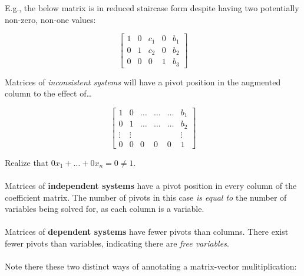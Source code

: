 \documentclass[12pt]{article}
\newcommand{\bt}[1]{\textbf{{#1}}}
\newcommand{\mb}{\begin{bmatrix}}
\newcommand{\me}{\end{bmatrix}}
\begin{document}
E.g., the below matrix is in reduced staircase form despite having two potentially non-zero, non-one values:

$$\mb
1 & 0 & c_1 & 0 & b_1 \\
0 & 1 & c_2 & 0 & b_2 \\
0 & 0 & 0 & 1 & b_3
\me$$

Matrices of \emph{inconsistent systems} will have a pivot position in the augmented column to the effect of\dots

$$\begin{bmatrix}
    1 & 0 & \dots & \dots & \dots & b_1 \\
    0 & 1 & \dots & \dots & \dots & b_2 \\
    \vdots & \vdots & & & & \vdots\\
    0 & 0 & 0 & 0 & 0 & 1
\end{bmatrix}$$

Realize that $0x_1 + \dots + 0x_n = 0 \neq 1$. \\ \\

Matrices of \bt{independent systems} have a pivot position in every column of the coefficient matrix.
The number of pivots in this case \emph{is equal to} the number of variables being solved for, as each column is a variable. \\ \\

Matrices of \bt{dependent systems} have fewer pivots than columns. There exist fewer pivots than variables, indicating there are \emph{free variables}. \\ \\

Note there these two distinct ways of annotating a matrix-vector mulitiplication:
\end{document}
